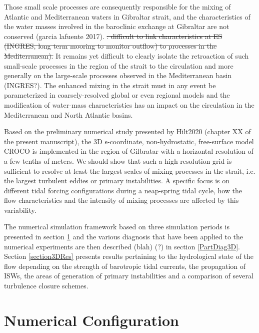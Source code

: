 Those small scale processes are consequently responsible for the mixing of Atlantic and Mediterranean waters in Gibraltar strait, and the characteristics of the water masses involved in the baroclinic exchange at Gibraltar are not conserved (garcia lafuente 2017). \color{blue} \sout{: difficult to link characteristics at ES (INGRES, long term mooring to monitor outflow) to processes in the Mediterranean).} It remains yet difficult to clearly isolate the retroaction of such small-scale processes in the region of the strait to the circulation and more generally on the large-scale processes observed in the Mediterranean basin  (INGRES?). \color{black}
The enhanced mixing in the strait must in any event be \color{black}parameterized in coarsely-resolved global or even regional models and the modification of water-mass characteristics \color{black} has an impact on the circulation in the Mediterranean and North Atlantic basins. 


Based on the preliminary numerical study presented by Hilt2020 \color{blue}(chapter XX of the present manuscript), the 3D s-coordinate, non-hydrostatic, free-surface model CROCO is implemented in the region of Gilbratar with a horizontal resolution of a few tenths of meters. We should show that such a high resolution grid is sufficient to resolve at least the largest scales of mixing processes in the strait, i.e. the largest turbulent eddies or primary instabilities. A specific focus is  on \color{black} different tidal forcing configurations during a neap-spring tidal cycle, how the flow characteristics and the intensity of mixing processes are affected by this variability.


The numerical simulation framework \color{blue} based on three simulation periods is presented in section \ref{section3Dnum} and the various diagnosis that have been applied to the numerical experiments are then described (blah) (?) in section \ref{PartDiag3D}. Section \ref{section3DRes} presents results pertaining to the hydrological state of the flow depending on the strength of barotropic tidal currents, the propagation of ISWs, the areas of generation of primary instabilities and a comparison of several turbulence closure schemes.\color{black}






\section{Numerical Configuration}
\label{section3Dnum}
